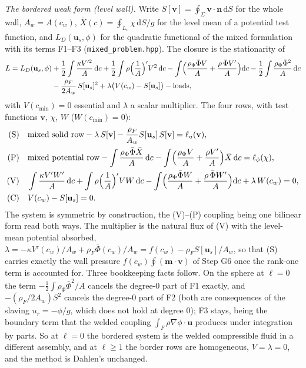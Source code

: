 \documentclass[11pt]{article}
\newcommand{\bu}{\mathbf{u}}
\newcommand{\bn}{\mathbf{n}}
\newcommand{\dS}{\,\mathrm{d}S}
\newcommand{\code}[1]{\texttt{#1}}
\begin{document}
\emph{The bordered weak form (level wall).} Write $S[\mathbf v] =
\oint_\Sigma\mathbf v\cdot\bn\dS$ for the whole wall, $A_w = A(c_w)$,
$\bar X(c) = \oint_{L_c}\chi\,\mathrm dS/g$ for the level mean of a
potential test function, and $L_D(\bu_s, \phi)$ for the quadratic
functional of the mixed formulation with its terms F1--F3
(\code{mixed\_problem.hpp}). The closure is the stationarity of
\begin{equation}
\begin{aligned}
  L = L_D(\bu_s,\phi)
  &+ \frac12\int\frac{\kappa V'^2}{A}\,\mathrm dc
   + \frac12\int\rho\Bigl(\frac1A\Bigr)'V^2\,\mathrm dc
   - \int\Bigl(\frac{\rho_\Phi\bar\Phi V}{A}
            + \frac{\rho\,\bar\Phi V'}{A}\Bigr)\mathrm dc
   - \frac12\int\frac{\rho_\Phi\bar\Phi^2}{A}\,\mathrm dc \\
  &- \frac{\rho_F}{2A_w}\,S[\bu_s]^2
   + \lambda\bigl(V(c_w) - S[\bu_s]\bigr) - \text{loads},
\end{aligned}
\label{eq:G-L}
\end{equation}
with $V(c_{\min}) = 0$ essential and $\lambda$ a scalar multiplier.
The four rows, with test functions $\mathbf v$, $\chi$, $W$
($W(c_{\min}) = 0$):
\begin{equation}
\begin{aligned}
  \text{(S)}&\quad
  \text{mixed solid row} - \lambda\,S[\mathbf v]
  - \frac{\rho_F}{A_w}S[\bu_s]\,S[\mathbf v] = \ell_u(\mathbf v),\\
  \text{(P)}&\quad
  \text{mixed potential row}
  - \int\frac{\rho_\Phi\bar\Phi\bar X}{A}\,\mathrm dc
  - \int\Bigl(\frac{\rho_\Phi V}{A} + \frac{\rho V'}{A}\Bigr)\bar X\,\mathrm dc
  = \ell_\phi(\chi),\\
  \text{(V)}&\quad
  \int\frac{\kappa V'W'}{A}\,\mathrm dc + \int\rho\Bigl(\frac1A\Bigr)'VW\,\mathrm dc
  - \int\Bigl(\frac{\rho_\Phi\bar\Phi W}{A} + \frac{\rho\,\bar\Phi W'}{A}\Bigr)\mathrm dc
  + \lambda\,W(c_w) = 0,\\
  \text{(C)}&\quad V(c_w) - S[\bu_s] = 0 .
\end{aligned}
\label{eq:G-rows}
\end{equation}
The system is symmetric by construction, the (V)--(P) coupling being
one bilinear form read both ways. The multiplier is the natural flux
of (V) with the level-mean potential absorbed,
$\lambda = -\kappa V'(c_w)/A_w + \rho_F\bar\Phi(c_w)/A_w = f(c_w) -
\rho_F S[\bu_s]/A_w$, so that (S) carries exactly the wall pressure
$f(c_w)\oint(\mathbf m\cdot\mathbf v)$ of Step G6 once the rank-one
term is accounted for. Three bookkeeping facts follow. On the sphere
at $\ell = 0$ the term $-\tfrac12\int\rho_\Phi\bar\Phi^2/A$ cancels the
degree-0 part of F1 exactly, and $-(\rho_F/2A_w)S^2$ cancels the
degree-0 part of F2 (both are consequences of the slaving
$u_r = -\phi/g$, which does not hold at degree 0); F3 stays, being the
boundary term that the welded coupling $\int_F\rho\nabla\phi\cdot\bu$
produces under integration by parts. So at $\ell = 0$ the bordered
system is the welded compressible fluid in a different assembly, and at
$\ell \ge 1$ the border rows are homogeneous, $V = \lambda = 0$, and the
method is Dahlen's unchanged.
\end{document}
